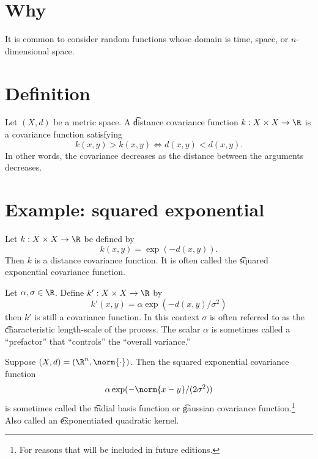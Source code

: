 
\section*{Why}

It is common to consider random functions whose domain is time, space, or $n$-dimensional space.

\section*{Definition}

Let $(X, d)$ be a metric space. A \t{distance covariance function} $k: X \times X \to \R $ is a covariance function satisfying
\[
k(x, y) > k(x, y) \iff d(x, y) < d(x, y).
\]
In other words, the covariance decreases as the distance between the arguments decreases.

\section*{Example: squared exponential}

Let $k: X \times X \to \R $ be defined by
\[
k(x, y) = \exp(-d(x, y)).
\]
Then $k$ is a distance covariance function.
It is often called the \t{squared exponential covariance function}.

Let $\alpha , \sigma  \in \R $.
Define $k': X \times X \to \R $ by
\[
k'(x, y) = \alpha \exp(-d(x, y)/\sigma ^2)
\]
then $k'$ is still a covariance function.
In this context $\sigma $ is often referred to as the \t{characteristic length-scale} of the process.
The scalar $\alpha $ is sometimes called a ``prefactor'' that ``controls'' the ``overall variance.''

Suppose $(X, d) = (\R ^n, \norm{\cdot })$.
Then the squared exponential covariance function
\[
\alpha \exp(-\norm{x - y}/(2\sigma ^2))
\]
is sometimes called the \t{radial basis function} or \t{gaussian covariance function}.\footnote{For reasons that will be included in future editions.}
Also called an \t{exponentiated quadratic kernel}.
